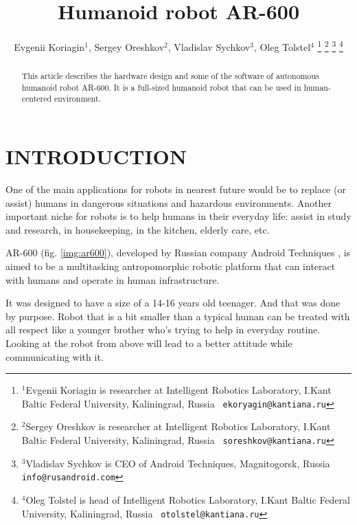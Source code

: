 \documentclass[letterpaper, 10 pt, conference]{ieeeconf}  %
\title{\LARGE \bf
Humanoid robot AR-600
}
\author{Evgenii Koriagin$^{1}$, Sergey Oreshkov$^{2}$, Vladislav
Sychkov$^{3}$, Oleg Tolstel$^{4}$%
\thanks{$^{1}$Evgenii Koriagin is researcher at Intelligent Robotics
Laboratory, I.Kant Baltic Federal University, Kaliningrad, Russia {\tt\small
ekoryagin@kantiana.ru}}%
\thanks{$^{2}$Sergey Oreshkov is researcher at Intelligent Robotics
Laboratory, I.Kant Baltic Federal University, Kaliningrad, Russia {\tt\small
soreshkov@kantiana.ru}}%
\thanks{$^{3}$Vladislav Sychkov is CEO of Android Techniques, Magnitogorsk,
Russia {\tt\small info@rusandroid.com}}%
\thanks{$^{4}$Oleg Tolstel is head of Intelligent Robotics
Laboratory, I.Kant Baltic Federal University, Kaliningrad, Russia {\tt\small
otolstel@kantiana.ru}}%
}
\begin{document}
\maketitle
\thispagestyle{empty}
\pagestyle{empty}


\begin{abstract}

This article describes the hardware design and some of the software of
autonomous humanoid robot AR-600. It is a full-sized humanoid robot that can be
used in human-centered environment. 

\end{abstract}


\section{INTRODUCTION}

One of the main applications for robots in nearest future would be to replace
(or assist) humans in dangerous situations and hazardous environments. Another
important niche for robots is to help humans in their everyday life: assist in
study and research, in housekeeping, in the kitchen, elderly care, etc.

AR-600 (fig. \ref{img:ar600}), developed by Russian company Android Techniques
\cite{c1}, is aimed to be a multitasking antropomorphic robotic platform that
can interact with humans and operate in human infrastructure. 
   
It was designed to have a size of a 14-16 years old teenager. And that was done
by purpose. Robot that is a bit smaller than a typical human can be treated
with all respect like a younger brother who's trying to help in everyday
routine. Looking at the robot from above will lead to a better attitude while
communicating with it. 
  
\end{document}
